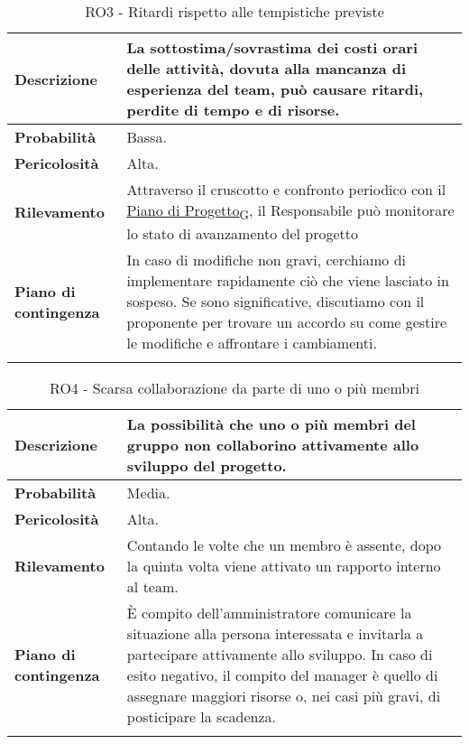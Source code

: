 \begin{longtable}{ | l | p{10cm} | }
    \hline
    \textbf{Descrizione} & La sottostima/sovrastima dei costi orari delle attività, dovuta alla mancanza di esperienza del team, può causare ritardi, perdite di tempo e di risorse. \\
    \hline
    \textbf{Probabilità} & Bassa. \\
    \hline
    \textbf{Pericolosità} & Alta. \\
    \hline
    \textbf{Rilevamento} & Attraverso il cruscotto e confronto periodico con il \href{https://7last.github.io/docs/rtb/documentazione-interna/glossario#piano-di-progetto}{Piano di Progetto\textsubscript{G}}, il Responsabile può monitorare lo stato di avanzamento del progetto \\
    \hline
    \textbf{Piano di contingenza} & In caso di modifiche non gravi, cerchiamo di implementare rapidamente ciò che viene lasciato in sospeso. Se sono significative, discutiamo con il proponente per trovare un accordo su come gestire le modifiche e affrontare i cambiamenti.\\
    \hline
    \caption{RO3 - Ritardi rispetto alle tempistiche previste}
    \label{table:3}
\end{longtable}

\begin{longtable}{ | l | p{10cm} | }
    \hline
    \textbf{Descrizione} & La possibilità che uno o più membri del gruppo non collaborino attivamente allo sviluppo del progetto. \\
    \hline
    \textbf{Probabilità} & Media. \\
    \hline
    \textbf{Pericolosità} & Alta. \\
    \hline
    \textbf{Rilevamento} & Contando le volte che un membro è assente, dopo la quinta volta viene attivato un rapporto interno al team.\\
    \hline
    \textbf{Piano di contingenza} & È compito dell'amministratore comunicare la situazione alla persona interessata e invitarla a partecipare attivamente allo sviluppo. In caso di esito negativo, il compito del manager è quello di assegnare maggiori risorse o, nei casi più gravi, di posticipare la scadenza.\\
    \hline
    \caption{RO4 - Scarsa collaborazione da parte di uno o più membri}
    \label{table:4}
\end{longtable}


